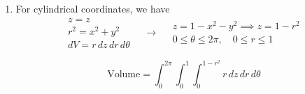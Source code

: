 \documentclass[a4paper, 12pt]{article}
\begin{document}
\begin{enumerate}[leftmargin=*,label=\textbf{\arabic*.}]
\begin{enumerate}[leftmargin=*,label=\textbf{\alph*.}]
Find $\rho_{\text{upper}}$ with the equation in \eqref{eq:20_21_spring_final_1}.
\[
\begin{array}{c}
\rho\cos\phi=1-\rho^2\sin^2\phi\implies \rho^2\sin^2\phi+\rho\cos\phi-1=0\\\\
\displaystyle \rho_{1,2} = \frac{-\cos\phi \pm\sqrt{\cos^2\phi-4\cdot\sin^2\phi\cdot(-1)}}{2\sin^2\phi}\quad\left[x_{1,2}=\frac{-b\pm\sqrt{b^2-4ac}}{2a}\right]\\\\
\displaystyle \rho>0\implies\rho_{\text{upper}}=\frac{-\cos\phi +\sqrt{\cos^2\phi+4\sin^2\phi}}{2\sin^2\phi}
\end{array}
\]

\[\boxed{\text{Volume}=\int_0^{2\pi}\int_0^{\pi/2}\int_0^{\textstyle\frac{-\cos\phi +\sqrt{\cos^2\phi+4\sin^2\phi}}{2\sin^2\phi}}\rho^2\sin\phi\,d\rho\,d\phi\,d\theta}\]

\item For cylindrical coordinates, we have
\[
\begin{array}{c}
z=z\\
r^2=x^2+y^2\\
dV=r\,dz\,dr\,d\theta
\end{array}\quad\rightarrow\quad
\begin{array}{c}
z=1-x^2-y^2\implies z=1-r^2\\
0\leq\theta\leq2\pi,\quad 0\leq r \leq1
\end{array}
\]

\[\boxed{\text{Volume}=\int_0^{2\pi}\int_0^1\int_0^{1-r^2}r\,dz\,dr\,d\theta}\]
\end{enumerate}
\end{enumerate}
\end{document}
